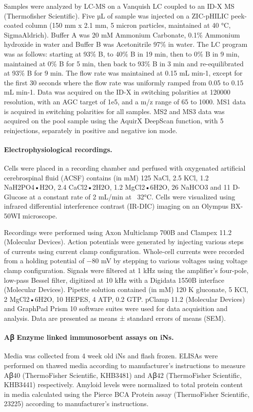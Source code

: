 Samples were analyzed by LC-MS on a Vanquish LC coupled to an ID-X MS (Thermofisher Scientific). Five µL of sample was injected on a ZIC-pHILIC peek-coated column (150 mm x 2.1 mm, 5 micron particles, maintained at 40 °C, SigmaAldrich). Buffer A was 20 mM Ammonium Carbonate, 0.1\% Ammonium hydroxide in water and Buffer B was Acetonitrile 97\% in water. The LC program was as follows: starting at 93\% B, to 40\% B in 19 min, then to 0\% B in 9 min, maintained at 0\% B for 5 min, then back to 93\% B in 3 min and re-equilibrated at 93\% B for 9 min. The flow rate was maintained at 0.15 mL min-1, except for the first 30 seconds where the flow rate was uniformly ramped from 0.05 to 0.15 mL min-1. Data was acquired on the ID-X in switching polarities at 120000 resolution, with an AGC target of 1e5, and a m/z range of 65 to 1000. MS1 data is acquired in switching polarities for all samples. MS2 and MS3 data was acquired on the pool sample using the AquirX DeepScan function, with 5 reinjections, separately in positive and negative ion mode. 

\paragraph{Electrophysiological recordings.}
Cells were placed in a recording chamber and perfused with oxygenated artificial cerebrospinal fluid (ACSF) contains (in mM) 125 NaCl, 2.5 KCl, 1.2 NaH2PO4•H2O, 2.4 CaCl2•2H2O, 1.2 MgCl2•6H2O, 26 NaHCO3 and 11 D-Glucose at a constant rate of 2 mL/min at ~32°C. Cells were visualized using infrared differential interference contrast (IR-DIC) imaging on an Olympus BX-50WI microscope.

Recordings were performed using Axon Multiclamp 700B and Clampex 11.2 (Molecular Devices). Action potentials were generated by injecting various steps of currents using current clamp configuration.  Whole-cell currents were recorded from a holding potential of −80 mV by stepping to various voltages using voltage clamp configuration. Signals were filtered at 1 kHz using the amplifier’s four-pole, low-pass Bessel filter, digitized at 10 kHz with a Digidata 1550B interface (Molecular Devices). Pipette solution contained (in mM) 120 K gluconate, 5 KCl, 2 MgCl2•6H2O, 10 HEPES, 4 ATP, 0.2 GTP. pClamp 11.2 (Molecular Devices) and GraphPad Prism 10 software suites were used for data acquisition and analysis. Data are presented as means ± standard errors of means (SEM).

\paragraph{Aꞵ Enzyme linked immunosorbent assays on iNs.}
Media was collected from 4 week old iNs and flash frozen. ELISAs were performed on thawed media according to manufacturer’s instructions to measure Aꞵ40 (ThermoFisher Scientific, KHB3481) and Aꞵ42 (ThermoFisher Scientific, KHB3441) respectively. Amyloid levels were normalized to total protein content in media calculated using the Pierce BCA Protein assay (ThermoFisher Scientific, 23225) according to manufacturer’s instructions.

